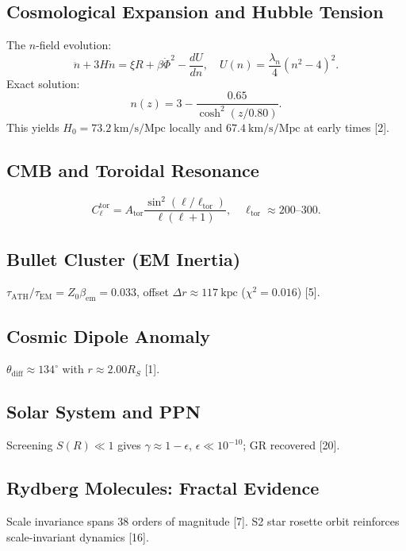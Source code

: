 \documentclass[12pt, a4paper]{article}
\begin{document}
\subsection{Cosmological Expansion and Hubble Tension}
The $n$-field evolution:
\begin{equation}
\ddot{n} + 3H\dot{n} = \xi R + \beta \dot{\Phi}^2 - \frac{dU}{dn}, \quad U(n) = \frac{\lambda_n}{4}(n^2 - 4)^2.
\label{eq:n_evolution}
\end{equation}
Exact solution:
\begin{equation}
n(z) = 3 - \frac{0.65}{\cosh^2(z/0.80)}.
\label{eq:nz_exact}
\end{equation}
This yields $H_0 = 73.2\ \mathrm{km/s/Mpc}$ locally and $67.4\ \mathrm{km/s/Mpc}$ at early times [2].

\subsection{CMB and Toroidal Resonance}
\begin{equation}
C_\ell^{\mathrm{tor}} = A_{\mathrm{tor}} \frac{\sin^2(\ell/\ell_{\mathrm{tor}})}{\ell(\ell+1)}, \quad \ell_{\mathrm{tor}} \approx 200\text{--}300.
\label{eq:cmb_toroidal}
\end{equation}

\subsection{Bullet Cluster (EM Inertia)}
$\tau_{\mathrm{ATH}}/\tau_{\mathrm{EM}} = Z_0 \beta_{\mathrm{em}} = 0.033$, offset $\Delta r \approx 117\ \mathrm{kpc}$ ($\chi^2 = 0.016$) [5].

\subsection{Cosmic Dipole Anomaly}
$\theta_{\mathrm{diff}} \approx 134^\circ$ with $r \approx 2.00R_S$ [1].

\subsection{Solar System and PPN}
Screening $S(R) \ll 1$ gives $\gamma \approx 1 - \epsilon$, $\epsilon \ll 10^{-10}$; GR recovered [20].

\subsection{Rydberg Molecules: Fractal Evidence}
Scale invariance spans 38 orders of magnitude [7]. S2 star rosette orbit reinforces scale-invariant dynamics [16].
\end{document}
